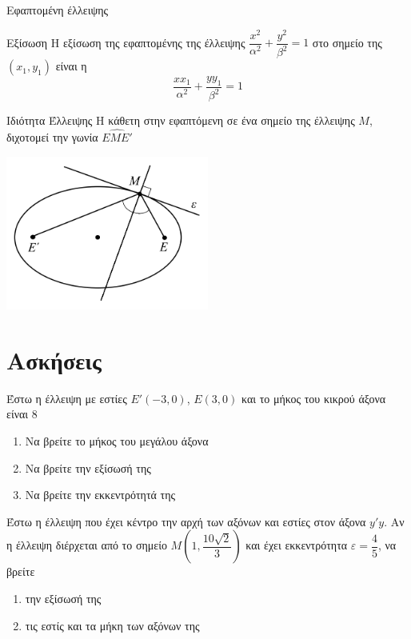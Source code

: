 \documentclass{../../presentation}
\begin{document}
\begin{frame}[label=Εφαπτόμενη]{Εφαπτομένη έλλειψης}
  \begin{block}{Εξίσωση}
    Η εξίσωση της εφαπτομένης της έλλειψης $\dfrac{x^2}{α^2}+\dfrac{y^2}{β^2}=1$ στο σημείο της $(x_1,y_1)$ είναι η $$\dfrac{xx_1}{α^2}+\dfrac{yy_1}{β^2}=1$$
  \end{block}

  \hyperlink{ΑπόδειξηΕφαπτόμενη}{}
\end{frame}

\begin{frame}[label=Ιδιότητες]{Ιδιότητα Έλλειψης}
  Η κάθετη στην εφαπτόμενη σε ένα σημείο της έλλειψης $Μ$, διχοτομεί την γωνία $\widehat{ΕΜΕ'}$

  \centering
  \includegraphics[width=0.5\textwidth]{"../images/reflection2.png"}

  \hyperlink{Απόδειξη}{}
\end{frame}

\section{Ασκήσεις}
\begin{askisi}
  Έστω η έλλειψη με εστίες $Ε'(-3,0)$, $Ε(3,0)$ και το μήκος του κικρού άξονα είναι $8$
  \begin{enumerate}
    \item<1-> Να βρείτε το μήκος του μεγάλου άξονα
    \item<2-> Να βρείτε την εξίσωσή της
    \item<3-> Να βρείτε την εκκεντρότητά της
  \end{enumerate}


\end{askisi}

\begin{askisi}
  Έστω η έλλειψη που έχει κέντρο την αρχή των αξόνων και εστίες στον άξονα $y'y$. Αν η έλλειψη διέρχεται από το σημείο $Μ\left( 1,\dfrac{10\sqrt{2}}{3} \right) $ και έχει εκκεντρότητα $ε=\dfrac{4}{5}$, να βρείτε
  \begin{enumerate}
    \item<1-> την εξίσωσή της
    \item<2-> τις εστίς και τα μήκη των αξόνων της
  \end{enumerate}


\end{askisi}
\end{document}
